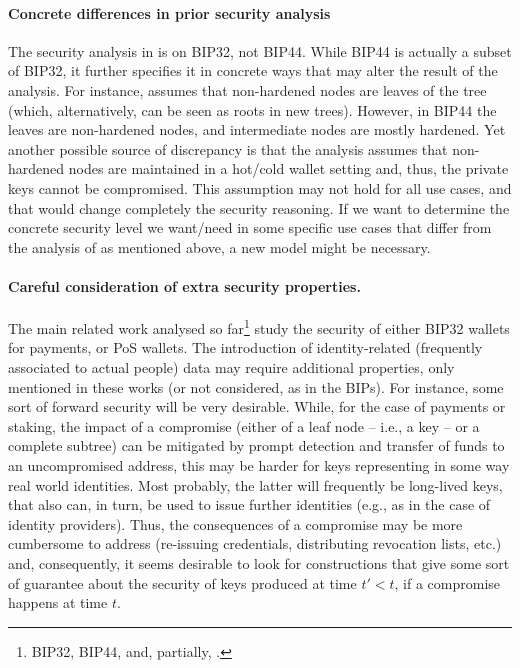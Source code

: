 \paragraph{Concrete differences in prior security analysis} %
The security analysis in \cite{def+21} is on BIP32, not BIP44. While BIP44
is actually a subset of BIP32, it further specifies it in concrete ways
that may alter the result of the analysis. For instance, \cite{def+21}
assumes that non-hardened nodes are leaves of the tree (which, alternatively,
can be seen as roots in new trees). However, in BIP44 the leaves are
non-hardened nodes, and intermediate nodes are mostly hardened. Yet another
possible source of discrepancy is that the analysis assumes that non-hardened
nodes are maintained in a hot/cold wallet setting and, thus, the private keys
cannot be compromised. This assumption may not hold for all use cases, and
that would change completely the security reasoning. If we want to determine
the concrete security level we want/need in some specific use cases that differ
from the analysis of \cite{def+21} as mentioned above, a new model might be
necessary.

\paragraph{Careful consideration of extra security properties.} %
The main related work analysed so far\footnote{BIP32, BIP44, \cite{def+21}
  and, partially, \cite{kkl20}.} study the security of either BIP32
wallets for payments, or PoS wallets. The introduction of identity-related
(frequently associated to actual people) data may require additional properties,
only mentioned in these works (or not considered, as in the BIPs). For instance,
some sort of forward security will be very desirable. While, for the case of
payments or staking, the impact of a compromise (either of a leaf node --
i.e., a key -- or a complete subtree) can be mitigated by prompt detection
and transfer of funds to an uncompromised address, this may be harder for
keys representing in some way real world identities. Most probably, the
latter will frequently be long-lived keys, that also can, in turn, be used
to issue further identities (e.g., as in the case of identity providers).
Thus, the consequences of a compromise may be more cumbersome to address
(re-issuing credentials, distributing revocation lists, etc.) and,
consequently, it seems desirable to look for constructions that give some
sort of guarantee about the security of keys produced at time $t' < t$, if a
compromise happens at time $t$.

